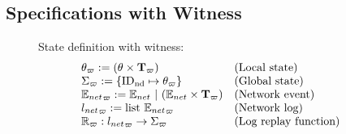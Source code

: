 \subsection{Specifications with Witness} 
\label{chapter:witnesspassing:subsec:specifications-with-witness}

\begin{figure}
\raggedright
{State definition with witness}:\\
$$
\begin{array}{ll}
\theta_\varpi:= (\theta \times {\textbf{T}_{\varpi}})  & \mbox{(Local state)} \\
\Sigma_\varpi := \{\mathrm{ID_{nd}} \mapsto \theta_\varpi\} & \mbox{(Global state)}\\
{\mathbb{E}_{net}}_\varpi:= {\mathbb{E}_{net}}~\vert~({\mathbb{E}_{net}} \times  {\textbf{T}_{\varpi}}) & \mbox{(Network event)}\\
{{l_{net}}}_{\varpi}:= \mbox{list}\ {\mathbb{E}_{net}}_\varpi & \mbox{(Network log)}\\
\mathbb{R}_\varpi : {{l_{net}}}_{\varpi} \rightarrow  \Sigma_\varpi& \mbox{(Log replay function)}\\
\end{array}
$$


\end{figure}
